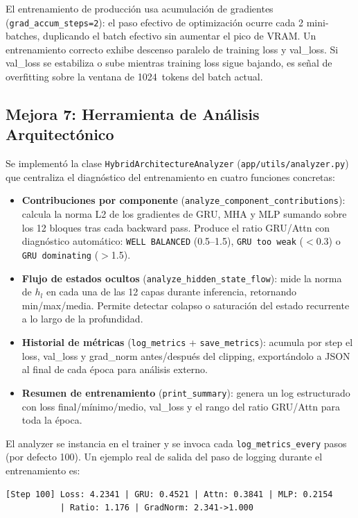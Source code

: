 El entrenamiento de producción usa acumulación de gradientes (\texttt{grad\_accum\_steps=2}): el paso efectivo de optimización ocurre cada 2 mini-batches, duplicando el batch efectivo sin aumentar el pico de VRAM. Un entrenamiento correcto exhibe descenso paralelo de training loss y val\_loss. Si val\_loss se estabiliza o sube mientras training loss sigue bajando, es señal de overfitting sobre la ventana de 1024~tokens del batch actual.

\subsection{Mejora 7: Herramienta de Análisis Arquitectónico}

Se implementó la clase \texttt{HybridArchitectureAnalyzer} (\texttt{app/utils/analyzer.py}) que centraliza el diagnóstico del entrenamiento en cuatro funciones concretas:

\begin{itemize}
    \item \textbf{Contribuciones por componente} (\texttt{analyze\_component\_contributions}): calcula la norma L2 de los gradientes de GRU, MHA y MLP sumando sobre los 12 bloques tras cada backward pass. Produce el ratio GRU/Attn con diagnóstico automático: \texttt{WELL BALANCED} (0.5–1.5), \texttt{GRU too weak} ($<$0.3) o \texttt{GRU dominating} ($>$1.5).
    \item \textbf{Flujo de estados ocultos} (\texttt{analyze\_hidden\_state\_flow}): mide la norma de $h_l$ en cada una de las 12 capas durante inferencia, retornando min/max/media. Permite detectar colapso o saturación del estado recurrente a lo largo de la profundidad.
    \item \textbf{Historial de métricas} (\texttt{log\_metrics} + \texttt{save\_metrics}): acumula por step el loss, val\_loss y grad\_norm antes/después del clipping, exportándolo a JSON al final de cada época para análisis externo.
    \item \textbf{Resumen de entrenamiento} (\texttt{print\_summary}): genera un log estructurado con loss final/mínimo/medio, val\_loss y el rango del ratio GRU/Attn para toda la época.
\end{itemize}

El analyzer se instancia en el trainer y se invoca cada \texttt{log\_metrics\_every} pasos (por defecto 100). Un ejemplo real de salida del paso de logging durante el entrenamiento es:

\begin{verbatim}
[Step 100] Loss: 4.2341 | GRU: 0.4521 | Attn: 0.3841 | MLP: 0.2154
           | Ratio: 1.176 | GradNorm: 2.341->1.000
\end{verbatim}

